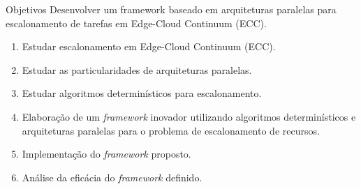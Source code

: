 \begin{frame}{Objetivos}
    Desenvolver um framework baseado em arquiteturas paralelas para
    escalonamento de tarefas em Edge-Cloud Continuum (ECC).
    \vspace{10px}
    \begin{enumerate}
        \item Estudar escalonamento em Edge-Cloud Continuum (ECC).
        \item Estudar as particularidades de arquiteturas paralelas.
        \item Estudar algoritmos determinísticos para escalonamento.
        \item Elaboração de um \textit{framework} inovador utilizando algoritmos determinísticos e arquiteturas paralelas para o problema de escalonamento de recursos.
        \item Implementação do \textit{framework} proposto.
        \item Análise da eficácia do \textit{framework} definido.
    \end{enumerate}
\end{frame}
